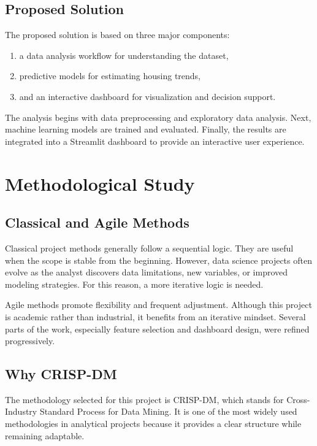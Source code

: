 \subsection{Proposed Solution}

The proposed solution is based on three major components:
\begin{enumerate}
\item a data analysis workflow for understanding the dataset,
\item predictive models for estimating housing trends,
\item and an interactive dashboard for visualization and decision support.
\end{enumerate}

The analysis begins with data preprocessing and exploratory data analysis.
Next, machine learning models are trained and evaluated.
Finally, the results are integrated into a Streamlit dashboard to provide an interactive user experience.

\section{Methodological Study}

\subsection{Classical and Agile Methods}

Classical project methods generally follow a sequential logic.
They are useful when the scope is stable from the beginning.
However, data science projects often evolve as the analyst discovers data limitations, new variables, or improved modeling strategies.
For this reason, a more iterative logic is needed.

Agile methods promote flexibility and frequent adjustment.
Although this project is academic rather than industrial, it benefits from an iterative mindset.
Several parts of the work, especially feature selection and dashboard design, were refined progressively.

\subsection{Why CRISP-DM}

The methodology selected for this project is CRISP-DM, which stands for Cross-Industry Standard Process for Data Mining.
It is one of the most widely used methodologies in analytical projects because it provides a clear structure while remaining adaptable.

